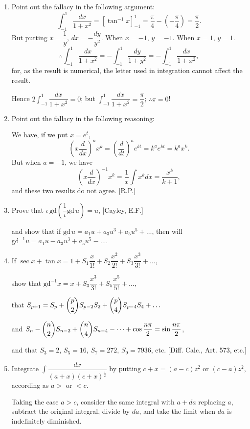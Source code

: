 \documentclass[11pt, a4paper]{article}
\newcommand{\source}[1]{\hfill\textnormal{[#1]}}
\begin{document}
\begin{enumerate}[leftmargin=2em]
\item Point out the fallacy in the following argument:
\[
\int_{-1}^1 \dfrac{dx}{1+x^2}=\left[\tan^{-1}x\right]_{-1}^1=\dfrac{\pi}{4}-\left(-\dfrac{\pi}{4}\right)=\dfrac{\pi}{2}.
\]
But putting $x=\dfrac{1}{y}$, $dx=-\dfrac{dy}{y^2}$. When $x=-1$, $y=-1$. When $x=1$, $y=1$.
\[
\therefore \int_{-1}^1 \dfrac{dx}{1+x^2}=-\int_{-1}^1 \dfrac{dy}{1+y^2}=-\int_{-1}^1 \dfrac{dx}{1+x^2},
\]
for, as the result is numerical, the letter used in integration cannot affect the result.

Hence $2\displaystyle\int_{-1}^1 \dfrac{dx}{1+x^2}=0$; but $\displaystyle\int_{-1}^1 \dfrac{dx}{1+x^2}=\dfrac{\pi}{2}$; $\therefore \pi=0$!

\item Point out the fallacy in the following reasoning:

We have, if we put $x=e^t$,
\[
\left(x\dfrac{d}{dx}\right)^a x^k=\left(\dfrac{d}{dt}\right)^a e^{kt}=k^a e^{kt}=k^a x^k.
\]
But when $a=-1$, we have
\[
\left(x\dfrac{d}{dx}\right)^{-1}x^k=\dfrac1x\int x^k dx=\dfrac{x^k}{k+1},
\]
and these two results do not agree. \source{R.P.}

\item Prove that $\iota\,\text{gd}\left(\dfrac1\iota \text{gd}\,u\right)=u$, \source{Cayley, E.F.}

and show that if $\text{gd}\,u=a_1u+a_3u^3+a_5u^5+\dots$,
then will $\text{gd}^{-1}u=a_1u-a_3u^3+a_5u^5-\dots$.

\item If $\sec x+\tan x=1+S_1\dfrac{x}{1!}+S_2\dfrac{x^2}{2!}+S_3\dfrac{x^3}{3!}+\dots$,

show that $\text{gd}^{-1}x=x+S_3\dfrac{x^3}{3!}+S_5\dfrac{x^5}{5!}+\dots$,

that $S_{p+1}=S_p+\dbinom{p}{2}S_{p-2}S_2+\dbinom{p}{4}S_{p-4}S_4+\dots$

and $S_n-\dbinom{n}{2}S_{n-2}+\dbinom{n}{4}S_{n-4}-\dots+\cos\dfrac{n\pi}{2}=\sin\dfrac{n\pi}{2}$,

and that $S_3=2$, $S_5=16$, $S_7=272$, $S_9=7936$, etc. \source{Diff. Calc., Art. 573, etc.}

\item Integrate $\displaystyle\int \dfrac{dx}{(a+x)(c+x)^{\frac12}}$
by putting $c+x=(a-c)z^2$ or $(c-a)z^2$,
according as $a>$ or $<c$.

Taking the case $a>c$, consider the same integral with $a+da$ replacing $a$, subtract the original integral, divide by $da$, and take the limit when $da$ is indefinitely diminished.


\end{enumerate}
\end{document}
